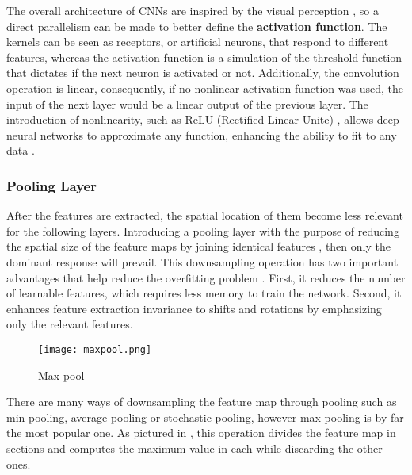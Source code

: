 \documentclass[class=report, crop=false, a4paper, 12pt]{standalone}
\begin{document}
\par The overall architecture of CNNs are inspired by the visual perception \autocite{hubelReceptiveFieldsBinocular1962}, so a direct parallelism can be made to better define the \textbf{activation function}. The kernels can be seen as receptors, or artificial neurons, that respond to different features, whereas the activation function is a simulation of the threshold function that dictates if the next neuron is activated or not. Additionally, the convolution operation is linear, consequently, if no nonlinear activation function was used, the input of the next layer would be a linear output of the previous layer. The introduction of nonlinearity, such as ReLU (Rectified Linear Unite) \autocite{nairRectifiedLinearUnits}, allows deep neural networks to approximate any function, enhancing the ability to fit to any data \autocite{liSurveyConvolutionalNeural2022}.

\subsubsection{Pooling Layer}
After the features are extracted, the spatial location of them become less relevant for the following layers. Introducing a pooling layer with the purpose of reducing the spatial size of the feature maps by joining identical features \autocite{lecunDeepLearning2015, guRecentAdvancesConvolutional2018}, then only the dominant response will prevail. This downsampling operation has two important advantages that help reduce the overfitting problem \autocite{ajitReviewConvolutionalNeural2020,liSurveyConvolutionalNeural2022}. First, it reduces the number of learnable features, which requires less memory to train the network. Second, it enhances feature extraction invariance to shifts and rotations by emphasizing only the relevant features.

\begin{figure}[!h]
    \centering
    \texttt{[image: maxpool.png]} %
    \caption{Max pool}
    \label{fig:maxpool}
\end{figure}

There are many ways of downsampling the feature map through pooling such as min pooling, average pooling or stochastic pooling, however max pooling is by far the most popular one. As pictured in , this operation divides the feature map in sections and computes the maximum value in each while discarding the other ones.
\end{document}
